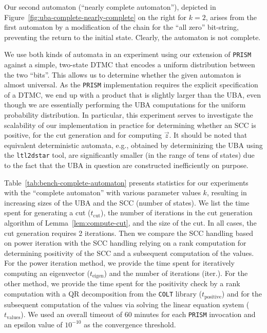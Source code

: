 \documentclass{elsarticle}
\newcommand{\prism}{\texttt{PRISM}}
\newcommand{\colt}{\texttt{COLT}}
\newcommand{\ltltodstar}{\texttt{ltl2dstar}}
\begin{document}
Our second automaton (``nearly complete automaton''),
depicted in Figure~\ref{fig:uba-complete-nearly-complete} on the right for $k=2$,
arises from the first automaton by a modification of the
chain for the ``all zero'' bit-string, preventing the return to the
initial state. Clearly, the automaton is not complete.

We use both kinds of automata in an experiment using our extension of
\prism{} against a simple, two-state DTMC that encodes a uniform
distribution between the two ``bits''. This allows us to determine
whether the given automaton is almost universal. As the \prism{}
implementation requires the explicit specification of a DTMC, we end
up with a product that is slightly larger than the UBA, even though we
are essentially performing the UBA computations for the uniform
probability distribution.
In particular, this
experiment serves to investigate the scalability of our implementation
in practice for determining whether an SCC is positive, for the cut
generation and for computing $\vec{z}$.
It should be noted that equivalent deterministic automata, e.g.,
obtained by determinizing the UBA using the \ltltodstar{} tool, are significantly
smaller (in the range of tens of states) due to the fact that the UBA
in question are constructed inefficiently on purpose.

Table~\ref{tab:bench-complete-automaton} presents statistics for
our experiments with the ``complete automaton'' with various parameter
values $k$, resulting in increasing sizes of the UBA and the SCC
(number of states). We list the time spent for generating a cut
($t_\mathrm{cut}$), the number of iterations in the cut generation algorithm of
Lemma~\ref{lem:compute-cut}, and the size of the
cut. In all cases, the cut generation requires 2 iterations. Then we
compare the SCC handling based on power iteration with the SCC
handling relying on a rank computation for determining positivity of
the SCC and a subsequent computation of the values. For the power
iteration method, we provide the time spent for iteratively computing
an eigenvector ($t_\mathrm{eigen}$) and the number of iterations
(iter.).
For the other method, we provide the time spent for the positivity
check by a rank computation with a QR decomposition from the \colt{}
library ($t_\mathrm{positive}$) and for the subsequent computation of
the values via solving the linear equation system
($t_\mathrm{values}$). We used an overall timeout of 60 minutes for
each \prism{} invocation and an epsilon value of $10^{-10}$ as the
convergence threshold.
\end{document}
